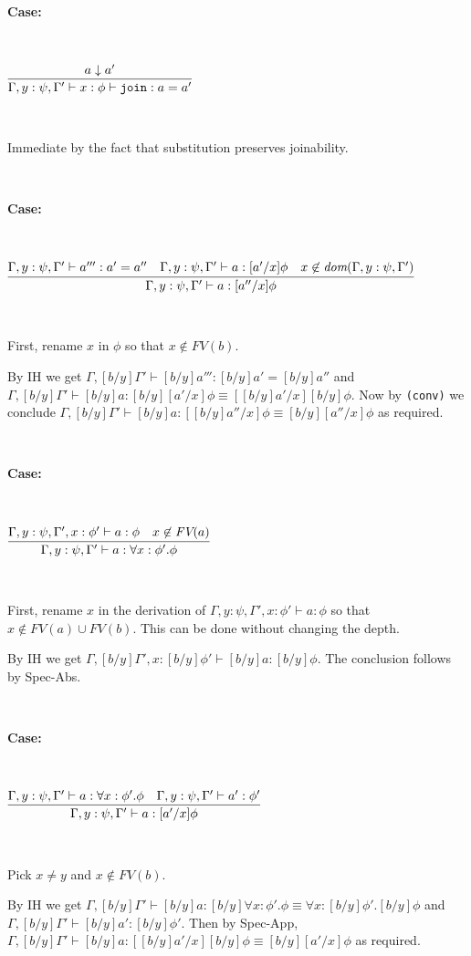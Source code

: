 \documentclass[copyright]{eptcs}
\newcommand{\join}[0]{\texttt{join}}
\begin{document}
\ 

\noindent \textbf{Case:}

\

$\infer{\Gamma,y:\psi,\Gamma'\vdash x:\phi\vdash \join : a = a'}{a \downarrow a'}$

\ 

\noindent Immediate by the fact that substitution preserves joinability.

\ 

\noindent \textbf{Case:}

\

$\infer{\Gamma,y:\psi,\Gamma'\vdash a:[a''/x]\phi}{\Gamma,y:\psi,\Gamma' \vdash a''': a' = a'' & \Gamma,y:\psi,\Gamma'\vdash a:[a'/x]\phi & x\not\in\textit{dom}(\Gamma,y:\psi,\Gamma')}$

\ 

\noindent First, rename $x$ in $\phi$ so that $x \not\in \mathit{FV}(b)$.

By IH we get $\Gamma, [b/y]\Gamma' \vdash [b/y]a''' : [b/y]a' = [b/y]a''$ and $\Gamma, [b/y]\Gamma' \vdash [b/y]a : [b/y][a'/x]\phi \equiv [[b/y]a'/x][b/y]\phi$. Now by \texttt{(conv)} we conclude $\Gamma, [b/y]\Gamma' \vdash [b/y]a : [[b/y]a''/x]\phi \equiv [b/y][a''/x]\phi$ as required.

\ 

\noindent \textbf{Case:}

\

$\infer{\Gamma,y:\psi,\Gamma' \vdash a : \forall x:\phi'.\phi}{\Gamma,y:\psi,\Gamma', x:\phi' \vdash a:\phi & x\not\in\textit{FV}(a)}$

\ 

\noindent First, rename $x$ in the derivation of $\Gamma,y:\psi,\Gamma', x:\phi' \vdash a:\phi$ so that $x \not\in \mathit{FV}(a) \cup \mathit{FV}(b)$. This can be done without changing the depth.

By IH we get $\Gamma,[b/y]\Gamma', x:[b/y]\phi' \vdash [b/y]a : [b/y]\phi$. The conclusion follows by Spec-Abs.

\ 

\noindent \textbf{Case:}

\

$\infer{\Gamma,y:\psi,\Gamma' \vdash a : [a'/x]\phi}{ \Gamma,y:\psi,\Gamma' \vdash a:\forall x:\phi'.\phi & \Gamma,y:\psi,\Gamma' \vdash a':\phi'}$

\ 

\noindent Pick $x \neq y$ and $x \not\in \mathit{FV}(b)$. 

By IH we get $\Gamma, [b/y]\Gamma' \vdash [b/y]a : [b/y]\forall x:\phi'.\phi \equiv \forall x:[b/y]\phi'.[b/y]\phi$ and $\Gamma, [b/y]\Gamma' \vdash [b/y]a' : [b/y]\phi'$. Then by Spec-App,  $\Gamma, [b/y]\Gamma' \vdash [b/y]a : [[b/y]a'/x][b/y]\phi \equiv [b/y][a'/x]\phi$ as required.
\end{document}
